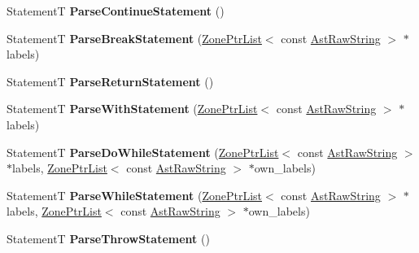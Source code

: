 \begin{DoxyCompactItemize}
StatementT {\bfseries Parse\+Continue\+Statement} ()
\item 
\mbox{\label{classv8_1_1internal_1_1ParserBase_a33790809d0d9a01e7be1eb37d150e9cb}} 
StatementT {\bfseries Parse\+Break\+Statement} (\mbox{\hyperlink{classv8_1_1internal_1_1ZoneList}{Zone\+Ptr\+List}}$<$ const \mbox{\hyperlink{classv8_1_1internal_1_1AstRawString}{Ast\+Raw\+String}} $>$ $\ast$labels)
\item 
\mbox{\label{classv8_1_1internal_1_1ParserBase_a6803e6336ec28f6dc3bfcac25e8c016f}} 
StatementT {\bfseries Parse\+Return\+Statement} ()
\item 
\mbox{\label{classv8_1_1internal_1_1ParserBase_ae2caac959a408a24f3c06f4f25713544}} 
StatementT {\bfseries Parse\+With\+Statement} (\mbox{\hyperlink{classv8_1_1internal_1_1ZoneList}{Zone\+Ptr\+List}}$<$ const \mbox{\hyperlink{classv8_1_1internal_1_1AstRawString}{Ast\+Raw\+String}} $>$ $\ast$labels)
\item 
\mbox{\label{classv8_1_1internal_1_1ParserBase_ac8c2f290225343298d63b63db3b3fef5}} 
StatementT {\bfseries Parse\+Do\+While\+Statement} (\mbox{\hyperlink{classv8_1_1internal_1_1ZoneList}{Zone\+Ptr\+List}}$<$ const \mbox{\hyperlink{classv8_1_1internal_1_1AstRawString}{Ast\+Raw\+String}} $>$ $\ast$labels, \mbox{\hyperlink{classv8_1_1internal_1_1ZoneList}{Zone\+Ptr\+List}}$<$ const \mbox{\hyperlink{classv8_1_1internal_1_1AstRawString}{Ast\+Raw\+String}} $>$ $\ast$own\+\_\+labels)
\item 
\mbox{\label{classv8_1_1internal_1_1ParserBase_a1ca2c8e436f9f42d6e2237d76c7a0606}} 
StatementT {\bfseries Parse\+While\+Statement} (\mbox{\hyperlink{classv8_1_1internal_1_1ZoneList}{Zone\+Ptr\+List}}$<$ const \mbox{\hyperlink{classv8_1_1internal_1_1AstRawString}{Ast\+Raw\+String}} $>$ $\ast$labels, \mbox{\hyperlink{classv8_1_1internal_1_1ZoneList}{Zone\+Ptr\+List}}$<$ const \mbox{\hyperlink{classv8_1_1internal_1_1AstRawString}{Ast\+Raw\+String}} $>$ $\ast$own\+\_\+labels)
\item 
\mbox{\label{classv8_1_1internal_1_1ParserBase_a0be0609813b3fdcfb94568aaf33a7208}} 
StatementT {\bfseries Parse\+Throw\+Statement} ()

\end{DoxyCompactItemize}
